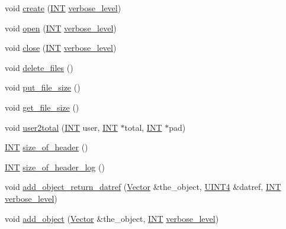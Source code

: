 \begin{DoxyCompactItemize}
\item 
void \mbox{\hyperlink{classdatabase_a41d486156468426370c803bea3976cf1}{create}} (\mbox{\hyperlink{galois_8h_a09fddde158a3a20bd2dcadb609de11dc}{I\+NT}} \mbox{\hyperlink{simeon_8_c_a818073fbcc2f439e7c56952f67386122}{verbose\+\_\+level}})
\item 
void \mbox{\hyperlink{classdatabase_a65e8eccf98ecab4d55fb25bacaae6a19}{open}} (\mbox{\hyperlink{galois_8h_a09fddde158a3a20bd2dcadb609de11dc}{I\+NT}} \mbox{\hyperlink{simeon_8_c_a818073fbcc2f439e7c56952f67386122}{verbose\+\_\+level}})
\item 
void \mbox{\hyperlink{classdatabase_acdc74d15f711cab1c165989723d45caf}{close}} (\mbox{\hyperlink{galois_8h_a09fddde158a3a20bd2dcadb609de11dc}{I\+NT}} \mbox{\hyperlink{simeon_8_c_a818073fbcc2f439e7c56952f67386122}{verbose\+\_\+level}})
\item 
void \mbox{\hyperlink{classdatabase_a3cdd5549da793e4b4f44e175eabe050e}{delete\+\_\+files}} ()
\item 
void \mbox{\hyperlink{classdatabase_a3490df2b9feac3d2cfab8a5d00033ab4}{put\+\_\+file\+\_\+size}} ()
\item 
void \mbox{\hyperlink{classdatabase_a3f59b9585dfaa4c0f45c00388a128aaf}{get\+\_\+file\+\_\+size}} ()
\item 
void \mbox{\hyperlink{classdatabase_ae87e9d8c044500276c16176b46fbf906}{user2total}} (\mbox{\hyperlink{galois_8h_a09fddde158a3a20bd2dcadb609de11dc}{I\+NT}} user, \mbox{\hyperlink{galois_8h_a09fddde158a3a20bd2dcadb609de11dc}{I\+NT}} $\ast$total, \mbox{\hyperlink{galois_8h_a09fddde158a3a20bd2dcadb609de11dc}{I\+NT}} $\ast$pad)
\item 
\mbox{\hyperlink{galois_8h_a09fddde158a3a20bd2dcadb609de11dc}{I\+NT}} \mbox{\hyperlink{classdatabase_a06a4fb255387e8bac32d98d365a90019}{size\+\_\+of\+\_\+header}} ()
\item 
\mbox{\hyperlink{galois_8h_a09fddde158a3a20bd2dcadb609de11dc}{I\+NT}} \mbox{\hyperlink{classdatabase_a2ed2d1231bc36e5267f6a8bac422738d}{size\+\_\+of\+\_\+header\+\_\+log}} ()
\item 
void \mbox{\hyperlink{classdatabase_a6b0c2e6ebb9938c57ce826647ed1ad40}{add\+\_\+object\+\_\+return\+\_\+datref}} (\mbox{\hyperlink{class_vector}{Vector}} \&the\+\_\+object, \mbox{\hyperlink{galois_8h_ac94af6544c710549c9fca744fd510395}{U\+I\+N\+T4}} \&datref, \mbox{\hyperlink{galois_8h_a09fddde158a3a20bd2dcadb609de11dc}{I\+NT}} \mbox{\hyperlink{simeon_8_c_a818073fbcc2f439e7c56952f67386122}{verbose\+\_\+level}})
\item 
void \mbox{\hyperlink{classdatabase_a880f60c1d94fff84d0db2b119361fbb6}{add\+\_\+object}} (\mbox{\hyperlink{class_vector}{Vector}} \&the\+\_\+object, \mbox{\hyperlink{galois_8h_a09fddde158a3a20bd2dcadb609de11dc}{I\+NT}} \mbox{\hyperlink{simeon_8_c_a818073fbcc2f439e7c56952f67386122}{verbose\+\_\+level}})

\end{DoxyCompactItemize}

